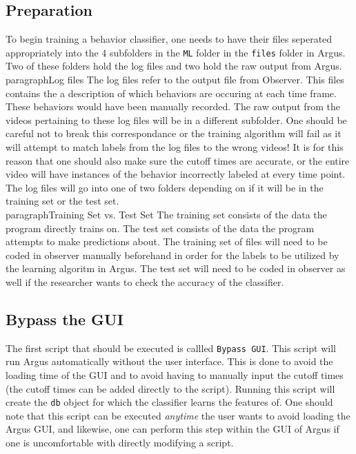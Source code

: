 \documentclass[12pt,titlepage]{report}
\begin{document}
\subsection{Preparation}
To begin training a behavior classifier, one needs to have their files seperated appropriately into the 4 subfolders in the \texttt{ML} folder in the \texttt{files} folder in Argus. Two of these folders hold the log files and two hold the raw output from Argus.
\\
paragraph{Log files} The log files refer to the output file from Observer. This files contains the a description of which behaviors are occuring at each time frame. These behaviors would have been manually recorded. The raw output from the videos pertaining to these log files will be in a different subfolder. One should be careful not to break this correspondance or the training algorithm will fail as it will attempt to match labels from the log files to the wrong videos! It is for this reason that one should also make sure the cutoff times are accurate, or the entire video will have instances of the behavior incorrectly labeled at every time point. The log files will go into one of two folders depending on if it will be in the training set or the test set.
\\
paragraph{Training Set vs. Test Set} The training set consists of the data the program directly trains on. The test set consists of the data the program attempts to make predictions about. The training set of files will need to be coded in observer manually beforehand in order for the labels to be utilized by the learning algoritm in Argus. The test set will need to be coded in observer as well if the researcher wants to check the accuracy of the classifier.

\subsection{Bypass the GUI}
The first script that should be executed is callled \texttt{Bypass GUI}. This script will run Argus automatically without the user interface. This is done to avoid the loading time of the GUI and to avoid having to manually input the cutoff times (the cutoff times can be added directly to the script). Running this script will create the \texttt{db} object for which the classifier learns the features of. One should note that this script can be executed \emph{anytime} the user wants to avoid loading the Argus GUI, and likewise, one can perform this step within the GUI of Argus if one is uncomfortable with directly modifying a script.
\end{document}
